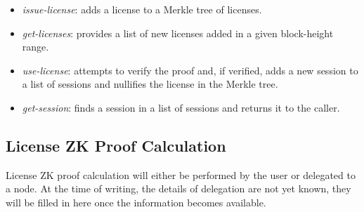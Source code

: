 \begin{itemize}%
	\item \textit{issue-license}: adds a license to a Merkle tree of licenses.
	\item \textit{get-licenses}: provides a list of new licenses added in a given block-height range.
	\item \textit{use-license}: attempts to verify the proof and, if verified, adds a new session to a list of sessions and nullifies the license in the Merkle tree.
	\item \textit{get-session}: finds a session in a list of sessions and returns it to the caller.
\end{itemize}


\subsection{License ZK Proof Calculation}

License ZK proof calculation will either be performed by the user or delegated to a node. At the time of writing, the details of delegation are not yet known, they will be filled in here once the information becomes available.
